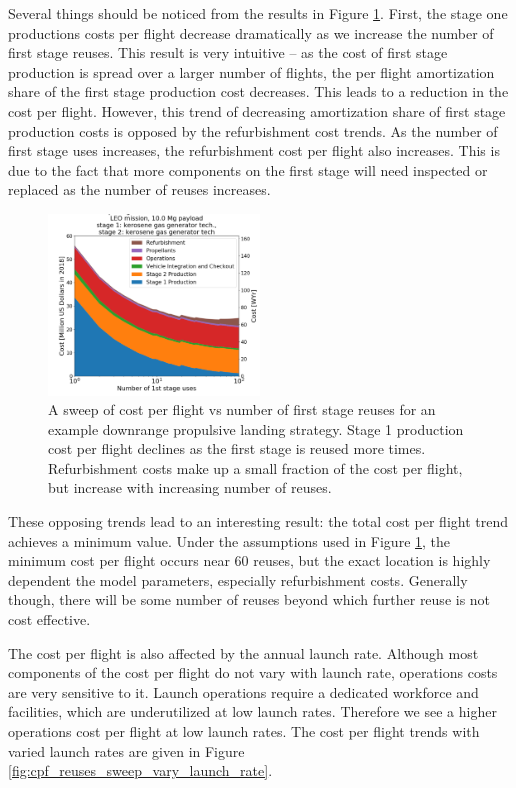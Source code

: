 \documentclass[conf]{new-aiaa}
\begin{document}
\begin{multicols}{2}
Several things should be noticed from the results in Figure \ref{fig:cpf_stackplot_reuses_sweep}. First, the stage one productions costs per flight decrease dramatically as we increase the number of first stage reuses. This result is very intuitive -- as the cost of first stage production is spread over a larger number of flights, the per flight amortization share of the first stage production cost decreases. This leads to a reduction in the cost per flight. However, this trend of decreasing amortization share of first stage production costs is opposed by the refurbishment cost trends. As the number of first stage uses increases, the refurbishment cost per flight also increases. This is due to the fact that more components on the first stage will need inspected or replaced  as the number of reuses increases. 

\begin{figure}[H]
    \centering
    \includegraphics[width=0.5\textwidth]{../../lvreuse/analysis/combined/plots/cpf_stackplot_reuses_sweep}
    \caption{\label{fig:cpf_stackplot_reuses_sweep} A sweep of cost per flight vs number of first stage reuses for an example downrange propulsive landing strategy. Stage 1 production cost per flight declines as the first stage is reused more times. Refurbishment costs make up a small fraction of the cost per flight, but increase with increasing number of reuses.}
\end{figure}

These opposing trends lead to an interesting result: the total cost per flight trend achieves a minimum value. Under the assumptions used in Figure \ref{fig:cpf_stackplot_reuses_sweep}, the minimum cost per flight occurs near 60 reuses, but the exact location is highly dependent the model parameters, especially refurbishment costs. Generally though, there will be some number of reuses beyond which further reuse is not cost effective.


The cost per flight is also affected by the annual launch rate. Although most components of the cost per flight do not vary with launch rate, operations costs are very sensitive to it. Launch operations require a dedicated workforce and facilities, which are underutilized at low launch rates. Therefore we see a higher operations cost per flight at low launch rates. The cost per flight trends with varied launch rates are given in Figure \ref{fig:cpf_reuses_sweep_vary_launch_rate}. 



\end{multicols}
\end{document}
